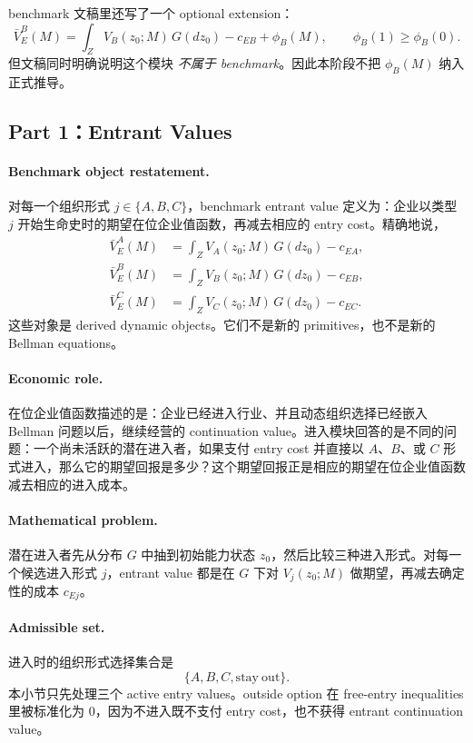 benchmark 文稿里还写了一个 optional extension：
\[
\bar V_E^B(M)=\int_Z V_B(z_0;M)\,G(dz_0)-c_{EB}+\phi_B(M),
\qquad
\phi_B(1)\ge \phi_B(0).
\]
但文稿同时明确说明这个模块 \emph{不属于 benchmark}。因此本阶段不把 $\phi_B(M)$ 纳入正式推导。

\subsection{Part 1：Entrant Values}

\paragraph{Benchmark object restatement.}
对每一个组织形式 $j\in\{A,B,C\}$，benchmark entrant value 定义为：企业以类型 $j$ 开始生命史时的期望在位企业值函数，再减去相应的 entry cost。精确地说，
\begin{align*}
\bar V_E^A(M)&=\int_Z V_A(z_0;M)\,G(dz_0)-c_{EA},\\
\bar V_E^B(M)&=\int_Z V_B(z_0;M)\,G(dz_0)-c_{EB},\\
\bar V_E^C(M)&=\int_Z V_C(z_0;M)\,G(dz_0)-c_{EC}.
\end{align*}
这些对象是 derived dynamic objects。它们不是新的 primitives，也不是新的 Bellman equations。

\paragraph{Economic role.}
在位企业值函数描述的是：企业已经进入行业、并且动态组织选择已经嵌入 Bellman 问题以后，继续经营的 continuation value。进入模块回答的是不同的问题：一个尚未活跃的潜在进入者，如果支付 entry cost 并直接以 $A$、$B$、或 $C$ 形式进入，那么它的期望回报是多少？这个期望回报正是相应的期望在位企业值函数减去相应的进入成本。

\paragraph{Mathematical problem.}
潜在进入者先从分布 $G$ 中抽到初始能力状态 $z_0$，然后比较三种进入形式。对每一个候选进入形式 $j$，entrant value 都是在 $G$ 下对 $V_j(z_0;M)$ 做期望，再减去确定性的成本 $c_{Ej}$。

\paragraph{Admissible set.}
进入时的组织形式选择集合是
\[
\{A,B,C,\mathrm{stay\ out}\}.
\]
本小节只先处理三个 active entry values。outside option 在 free-entry inequalities 里被标准化为 0，因为不进入既不支付 entry cost，也不获得 entrant continuation value。

